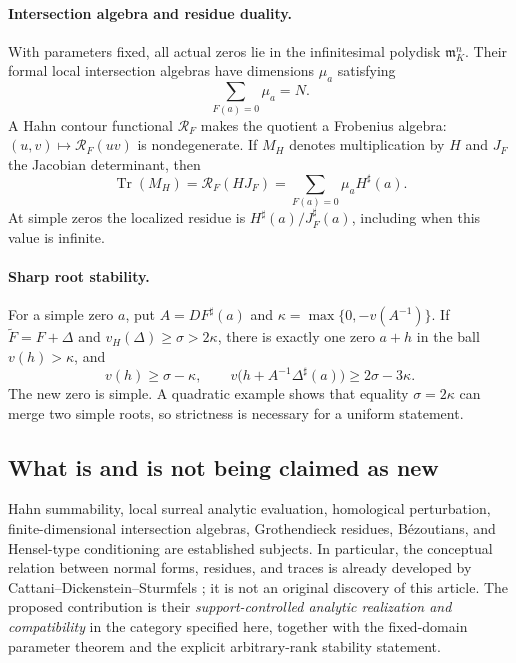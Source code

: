 \documentclass[11pt,letterpaper]{article}
\theoremstyle{definition}
\theoremstyle{remark}
\newcommand{\mm}{\mathfrak m}
\newcommand{\RR}{\mathscr R}
\newcommand{\sh}{^{\sharp}}
\newcommand{\Tr}{\operatorname{Tr}}
\numberwithin{equation}{section}
\begin{document}
\paragraph{Intersection algebra and residue duality.}
With parameters fixed, all actual zeros lie in the infinitesimal polydisk $\mm_K^n$. Their formal local intersection algebras have dimensions $\mu_a$ satisfying
\[
 \sum_{F(a)=0}\mu_a=N.
\]
A Hahn contour functional $\RR_F$ makes the quotient a Frobenius algebra: $(u,v)\mapsto\RR_F(uv)$ is nondegenerate. If $M_H$ denotes multiplication by $H$ and $J_F$ the Jacobian determinant, then
\begin{equation}\label{eq:introtrace}
 \Tr(M_H)=\RR_F(HJ_F)
          =\sum_{F(a)=0}\mu_a H\sh(a).
\end{equation}
At simple zeros the localized residue is $H\sh(a)/J_F\sh(a)$, including when this value is infinite.

\paragraph{Sharp root stability.}
For a simple zero $a$, put $A=DF\sh(a)$ and $\kappa=\max\{0,-v(A^{-1})\}$. If $\widetilde F=F+\Delta$ and $v_H(\Delta)\ge\sigma>2\kappa$, there is exactly one zero $a+h$ in the ball $v(h)>\kappa$, and
\begin{equation}\label{eq:introstability}
 v(h)\ge\sigma-\kappa,\qquad
 v\bigl(h+A^{-1}\Delta\sh(a)\bigr)\ge2\sigma-3\kappa.
\end{equation}
The new zero is simple. A quadratic example shows that equality $\sigma=2\kappa$ can merge two simple roots, so strictness is necessary for a uniform statement.

\subsection{What is and is not being claimed as new}
Hahn summability, local surreal analytic evaluation, homological perturbation, finite-dimensional intersection algebras, Grothendieck residues, B\'ezoutians, and Hensel-type conditioning are established subjects. In particular, the conceptual relation between normal forms, residues, and traces is already developed by Cattani--Dickenstein--Sturmfels \cite{CDS}; it is not an original discovery of this article. The proposed contribution is their \emph{support-controlled analytic realization and compatibility} in the category specified here, together with the fixed-domain parameter theorem and the explicit arbitrary-rank stability statement.
\end{document}
